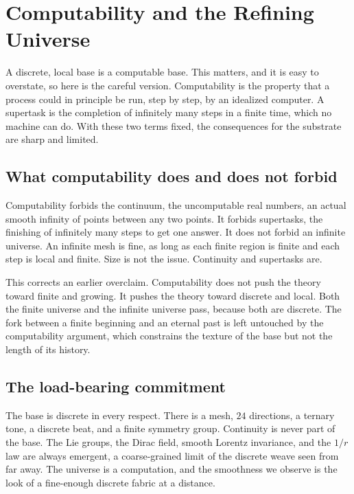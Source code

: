 \section{Computability and the Refining Universe}

A discrete, local base is a computable base. This matters, and it is easy to overstate, so here is the careful
version. Computability is the property that a process could in principle be run, step by step, by an idealized
computer. A supertask is the completion of infinitely many steps in a finite time, which no machine can do. With
these two terms fixed, the consequences for the substrate are sharp and limited.

\subsection{What computability does and does not forbid}

Computability forbids the continuum, the uncomputable real numbers, an actual smooth infinity of points between
any two points. It forbids supertasks, the finishing of infinitely many steps to get one answer. It does not
forbid an infinite universe. An infinite mesh is fine, as long as each finite region is finite and each step is
local and finite. Size is not the issue. Continuity and supertasks are.

This corrects an earlier overclaim. Computability does not push the theory toward finite and growing. It pushes
the theory toward discrete and local. Both the finite universe and the infinite universe pass, because both are
discrete. The fork between a finite beginning and an eternal past is left untouched by the computability argument,
which constrains the texture of the base but not the length of its history.

\subsection{The load-bearing commitment}

\begin{principle}
The base is discrete in every respect. There is a mesh, $24$ directions, a ternary tone, a discrete beat, and a
finite symmetry group. Continuity is never part of the base. The Lie groups, the Dirac field, smooth Lorentz
invariance, and the $1/r$ law are always emergent, a coarse-grained limit of the discrete weave seen from far
away. The universe is a computation, and the smoothness we observe is the look of a fine-enough discrete fabric at
a distance.
\end{principle}


